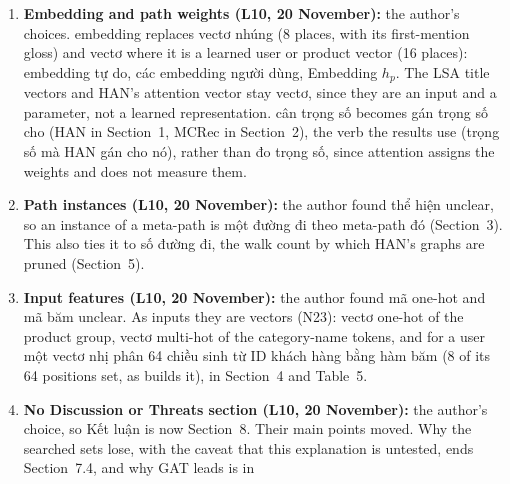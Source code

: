 \documentclass[11pt,a4paper]{article}
\DeclareRobustCommand{\code}[1]{\texttt{\detokenize{#1}}}
\newcommand{\vi}[1]{\foreignlanguage{vietnamese}{#1}}
\begin{document}
\begin{enumerate}[label=N\arabic*]
        that \vi{chọn ngẫu nhiên} keeps one meaning, other sampling is \vi{lấy mẫu} (LMSPS's
        meta-paths, the negatives), ties are \vi{bằng điểm thì xếp ngẫu nhiên}, and the
        validation-selected set is \vi{vốn là một tập ngẫu nhiên}. \vi{SVD rút gọn} (truncated SVD)
        is not a draw and stays. The author's final introduction (20 November) drops \vi{một lần
        (one-shot)} from LMSPS's description, the gloss \vi{(leakage)}, and the sentence on the
        cheapest option, which Section~8 keeps. Its two limits are reworded, and its \vi{tác vụ}
        became \vi{bài toán}, as everywhere else. The main text ends 0.03 page later (9.11 pages in).
  \item \textbf{Embedding and path weights (L10, 20 November):} the author's choices.
        \vi{embedding} replaces \vi{vectơ nhúng} (8 places, with its first-mention gloss) and
        \vi{vectơ} where it is a learned user or product vector (16 places): \vi{embedding tự do},
        \vi{các embedding người dùng}, \vi{Embedding $h_p$}. The LSA title vectors and HAN's
        attention vector stay \vi{vectơ}, since they are an input and a parameter, not a learned
        representation. \vi{cân trọng số} becomes \vi{gán trọng số cho} (HAN in Section~1, MCRec in
        Section~2), the verb the results use (\vi{trọng số mà HAN gán cho nó}), rather than
        \vi{đo trọng số}, since attention assigns the weights and does not measure them.
  \item \textbf{Path instances (L10, 20 November):} the author found \vi{thể hiện} unclear, so an
        instance of a meta-path is \vi{một đường đi theo meta-path đó} (Section~3). This also ties
        it to \vi{số đường đi}, the walk count by which HAN's graphs are pruned (Section~5).
  \item \textbf{Input features (L10, 20 November):} the author found \vi{mã one-hot} and \vi{mã
        băm} unclear. As inputs they are vectors (N23): \vi{vectơ one-hot} of the product group,
        \vi{vectơ multi-hot} of the category-name tokens, and for a user \vi{một vectơ nhị phân
        64 chiều sinh từ ID khách hàng bằng hàm băm} (8 of its 64 positions set, as
        \code{hgb/dat_generator.py} builds it), in Section~4 and Table~5.
  \item \textbf{No Discussion or Threats section (L10, 20 November):} the author's choice, so
        \vi{Kết luận} is now Section~8. Their main points moved. Why the searched sets lose, with
        the caveat that this explanation is untested, ends Section~7.4, and why GAT leads is in

\end{enumerate}
\end{document}
